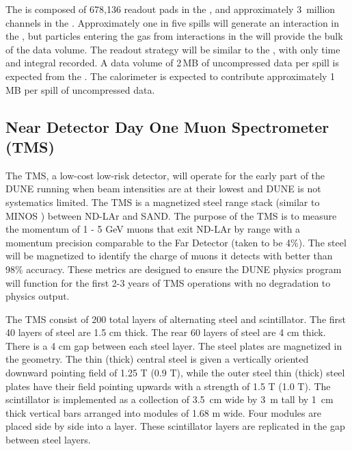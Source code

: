 \documentclass[../main-v1.tex]{subfiles}
\begin{document}
The  is composed of 678,136 readout pads in the , and approximately 3~million channels in the .  Approximately one in five spills will generate an interaction in the , but particles entering the gas from interactions in the  will provide the bulk of the data volume.  The readout strategy will be similar to the , with only time and integral recorded. A  data volume of 2\,MB of uncompressed data per spill is expected from the .  The calorimeter is expected to contribute approximately 1\,MB per spill of uncompressed data.


\subsection{Near Detector Day One Muon Spectrometer (TMS) }
\label{sec:comp-dataestimates-mpd}

The TMS, a low-cost low-risk detector, will operate for the early part of the DUNE running when beam intensities are at their lowest and DUNE is not systematics limited. The TMS is a magnetized steel range stack (similar to MINOS \cite{minosNIM}) between ND-LAr and SAND.  The purpose of the TMS is to measure the momentum of 1 - 5 GeV muons that exit ND-LAr by range with a momentum precision comparable to the Far Detector (taken to be 4\%). The steel will be magnetized to identify the charge of muons it detects with better than 98\% accuracy. These metrics are designed to ensure the DUNE physics program will function for the first 2-3 years of TMS operations with no degradation to physics output.

The TMS consist of 200 total layers of alternating steel and scintillator. The first 40 layers of steel are 1.5 cm thick. The rear 60 layers of steel are 4 cm thick. There is a 4 cm gap between each steel layer. The steel plates are magnetized in the geometry. The thin (thick) central steel is given a vertically oriented downward pointing field of 1.25 T (0.9 T), while the outer steel thin (thick) steel plates have their field pointing upwards with a strength of 1.5 T (1.0 T). The scintillator is implemented as a collection of 3.5~cm wide by 3~m tall by 1~cm thick vertical bars arranged into modules of 1.68 m wide. Four modules are placed side by side into a layer. These scintillator layers are replicated in the gap between steel layers.  
\end{document}
